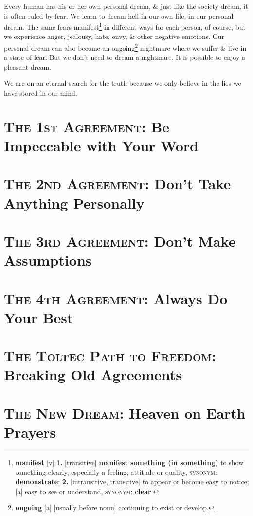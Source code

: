 \documentclass[oneside]{book}
\numberwithin{equation}{section}
\begin{document}
Every human has his or her own personal dream, \& just like the society dream, it is often ruled by fear. We learn to dream hell in our own life, in our personal dream. The same fears manifest\footnote{\textbf{manifest} [v] \textbf{1.} [transitive] \textbf{manifest something (in something)} to show something clearly, especially a feeling, attitude or quality, \textsc{synonym}: \textbf{demonstrate}; \textbf{2.} [intransitive, transitive] to appear or become easy to notice; [a] easy to see or understand, \textsc{synonym}: \textbf{clear}.} in different ways for each person, of course, but we experience anger, jealousy, hate, envy, \& other negative emotions. Our personal dream can also become an ongoing\footnote{\textbf{ongoing} [a] [usually before noun] continuing to exist or develop.} nightmare where we suffer \& live in a state of fear. But we don't need to dream a nightmare. It is possible to enjoy a pleasant dream.

 We are on an eternal search for the truth because we only believe in the lies we have stored in our mind.


\section{\textsc{The 1st Agreement}: Be Impeccable with Your Word}

\section{\textsc{The 2nd Agreement}: Don't Take Anything Personally}

\section{\textsc{The 3rd Agreement}: Don't Make Assumptions}

\section{\textsc{The 4th Agreement}: Always Do Your Best}

\section{\textsc{The Toltec Path to Freedom}: Breaking Old Agreements}

\section{\textsc{The New Dream}: Heaven on Earth Prayers}




\printbibliography[heading=bibintoc]
	
\end{document}
